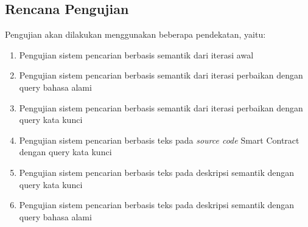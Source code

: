 \subsection{Rencana Pengujian}

Pengujian akan dilakukan menggunakan beberapa pendekatan, yaitu:

\begin{enumerate}
	\item Pengujian sistem pencarian berbasis semantik dari iterasi awal
	\item Pengujian sistem pencarian berbasis semantik dari iterasi perbaikan dengan query bahasa alami
	\item Pengujian sistem pencarian berbasis semantik dari iterasi perbaikan dengan query kata kunci 
	\item Pengujian sistem pencarian berbasis teks pada \textit{source code} Smart Contract dengan query kata kunci
	\item Pengujian sistem pencarian berbasis teks pada deskripsi semantik dengan query kata kunci
	\item Pengujian sistem pencarian berbasis teks pada deskripsi semantik dengan query bahasa alami
\end{enumerate}